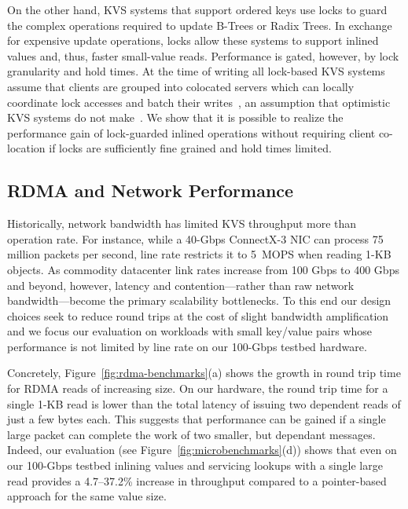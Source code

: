 On the other hand, KVS systems that support ordered keys use
locks to guard the complex operations required to update B-Trees or
Radix Trees.  In exchange for expensive update operations, locks allow
these systems to support inlined values and, thus, faster small-value
reads.  Performance is gated, however, by lock granularity and hold
times. At the time of writing all lock-based KVS systems assume that
clients are grouped into colocated servers which can locally
coordinate lock accesses and batch their writes~\cite{smart,sherman},
an assumption that optimistic
KVS systems do not make~\cite{ditto,fusee,clover,race}. We show that it is possible to
realize the performance gain of lock-guarded inlined operations
without requiring client co-location if locks are sufficiently fine
grained and hold times limited.

\subsection{RDMA and Network Performance}

Historically, network bandwidth has limited KVS throughput more than
operation rate. For instance, while a 40-Gbps ConnectX-3 NIC can
process 75 million packets per second, line rate restricts it to
5~MOPS when reading 1-KB objects. As commodity datacenter link rates
increase from 100 Gbps to 400 Gbps and beyond, however, latency and
contention---rather than raw network bandwidth---become the primary
scalability bottlenecks. To this end our design choices seek to reduce
round trips at the cost of slight bandwidth amplification
and we focus our evaluation on workloads with small key/value pairs
whose performance is not limited by line rate on our 100-Gbps testbed
hardware.

Concretely, Figure~\ref{fig:rdma-benchmarks}(a) shows the growth in
round trip time for RDMA reads of increasing size. On our hardware,
the round trip time for a single 1-KB read is lower than the total
latency of issuing two dependent reads of just a few bytes each.  This
suggests that performance can be gained if a single large packet can
complete the work of two smaller, but dependant messages.  
Indeed, our
evaluation (see Figure~\ref{fig:microbenchmarks}(d)) shows that even on our
100-Gbps testbed inlining values and servicing lookups with a single
large read provides a 4.7--37.2\% increase in throughput compared to a
pointer-based approach for the same value size.


